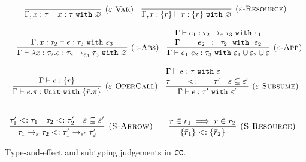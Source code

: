 \begin{figure}
\vspace*{-5mm}
\noindent
{}
\vspace{-0mm}
\[
\begin{array}{c}
\infer[\textsc{($\varepsilon$-Var)}]
	{ \Gamma, x:\tau \vdash x: \tau~\kw{with} \varnothing }
	{}
	
	~~~
	
\infer[\textsc{($\varepsilon$-Resource)}]
 	{ \Gamma, r: \{ r \} \vdash r : \{ r \}~\kw{with} \varnothing }
 	{} \\[3ex]
 	
 	~~~
	\infer[\textsc{($\varepsilon$-Abs)}]
	{ \Gamma \vdash \lambda x:\tau_2 . e : \tau_2 \rightarrow_{\varepsilon_3} \tau_3~\kw{with} \varnothing }
	{ \Gamma, x: \tau_2 \vdash e: \tau_3~\kw{with} \varepsilon_3 }
	
	~~~
	
\infer[\textsc{($\varepsilon$-App)}]
	{ \Gamma \vdash e_1~e_2 : \tau_3~\kw{with} \varepsilon_1 \cup \varepsilon_2 \cup \varepsilon  }
	{ \Gamma \vdash e_1: \tau_2 \rightarrow_{\varepsilon} \tau_3~\kw{with} \varepsilon_1 \\[.6mm]
          \Gamma \vdash e_2: \tau_2~\kw{with} \varepsilon_2 } \\[3ex]
	
\infer[\textsc{($\varepsilon$-OperCall)}]
	{ \Gamma \vdash e.\pi: \kw{Unit} \kw{with} \{ \bar r.\pi \} }
	{ \Gamma \vdash e: \{ \bar r \} } 

	~~~

\infer[\textsc{($\varepsilon$-Subsume)}]
	{ \Gamma \vdash e: \tau' ~\kw{with} \varepsilon'}
	{ \Gamma \vdash e: \tau ~\kw{with} \varepsilon \\[.6mm] \tau <: \tau' & \varepsilon \subseteq \varepsilon'}\\[3ex]
\end{array}
\]


\[
\begin{array}{c}
\infer[\textsc{(S-Arrow)}]
	{ \tau_1 \rightarrow_{\varepsilon} \tau_2 <: \tau_1' \rightarrow_{\varepsilon'} \tau_2' }
	{ \tau_1' <: \tau_1 & \tau_2 <: \tau_2' & \varepsilon \subseteq \varepsilon' }
~~~~~~
\infer[\textsc{(S-Resource)}]
	{ \{ \bar r_1 \} <: \{ \bar r_2 \} }
	{ r \in r_1 \implies r \in r_2 }
\end{array}
\]
\vspace*{-5mm}
\caption{Type-and-effect and subtyping judgements in $\mathtt{CC}$.}
\vspace*{-5mm}
\label{fig:cc_static_rules}
\end{figure}

